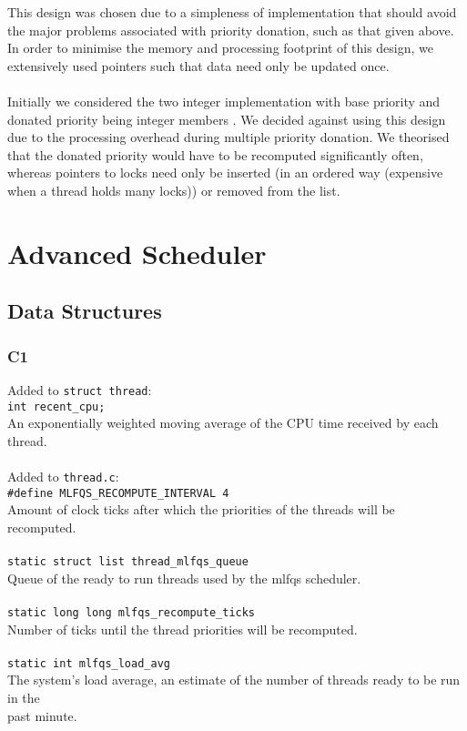 \documentclass[a4wide, 11pt]{article}
\newcommand{\tab}{\hspace*{2em}}
\newcommand{\tx}{\texttt}
\begin{document}
This design was chosen due to a simpleness of implementation that should avoid 
the major problems associated with priority donation, such as that given above. 
In order to minimise the memory and processing footprint of this design, we 
extensively used pointers such that data need only be updated once. 
\\\\
Initially we considered the two integer implementation with base priority and 
donated priority being integer members . We decided against using this design due to the processing 
overhead during multiple priority donation. We theorised that the donated 
priority would have to be recomputed significantly often, whereas pointers to 
locks need only be inserted (in an ordered way (expensive when a thread holds 
many locks)) or removed from the list. 

\section{Advanced Scheduler}
\subsection{Data Structures}
\subsubsection{C1}

Added to \tx{struct thread}: \\
\tab\tab \tx{int recent\_cpu;} \\
\tab\tab An exponentially weighted moving average of the CPU time received by each thread.
\\\\
Added to \tx{thread.c}: \\
\tab\tab \tx{\#define MLFQS\_RECOMPUTE\_INTERVAL 4} \\
\tab\tab Amount of clock ticks after which the priorities of the threads will be recomputed.
\\\\
\tab\tab \tx{static struct list thread\_mlfqs\_queue}\\
\tab\tab Queue of the ready to run threads used by the mlfqs scheduler.
\\\\
\tab\tab \tx{static long long mlfqs\_recompute\_ticks} \\
\tab\tab Number of ticks until the thread priorities will be recomputed.
\\\\
\tab\tab \tx{static int mlfqs\_load\_avg}\\
\tab\tab The system's load average, an estimate of the number of threads ready to be run in the \\
\tab\tab past minute.
\newpage
\end{document}
